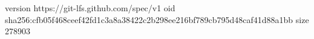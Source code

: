 version https://git-lfs.github.com/spec/v1
oid sha256:cfb05f468ceef42fd1c3a8a38422c2b298ee216bf789cb795d48caf41d88a1bb
size 278903
